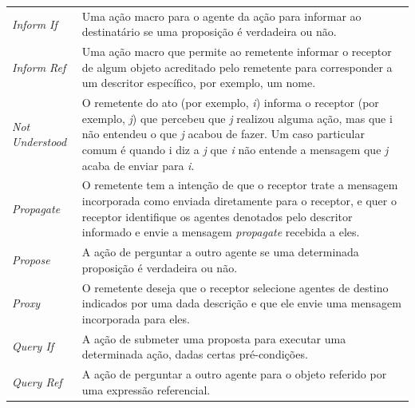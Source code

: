 \begin{table}
{\begin{tabular}{ l l }
  \\  
  \cline{1-1}\cline{2-2}  
    \multicolumn{1}{|p{2.750cm}|}{\textit{Inform If}} &
    \multicolumn{1}{p{11.700cm}|}{Uma ação macro para o agente da ação para informar ao destinatário se uma proposição é verdadeira ou não.}
  \\  
  \cline{1-1}\cline{2-2}  
    \multicolumn{1}{|p{2.750cm}|}{\textit{Inform Ref}} &
    \multicolumn{1}{p{11.700cm}|}{Uma ação macro que permite ao remetente informar o receptor de algum objeto acreditado pelo remetente para corresponder a um descritor específico, por exemplo, um nome.}
  \\  
  \cline{1-1}\cline{2-2}  
    \multicolumn{1}{|p{2.750cm}|}{\textit{Not Understood}} &
    \multicolumn{1}{p{11.700cm}|}{O remetente do ato (por exemplo, \textit{i}) informa o receptor (por exemplo, \textit{j}) que percebeu que \textit{j }realizou alguma ação, mas que i não entendeu o que \textit{j} acabou de fazer. Um caso particular comum é quando i diz a\textit{ j} que \textit{i} não entende a mensagem que \textit{j} acaba de enviar para \textit{i}.}
  \\  
  \cline{1-1}\cline{2-2}  
    \multicolumn{1}{|p{2.750cm}|}{\textit{Propagate}} &
    \multicolumn{1}{p{11.700cm}|}{O remetente tem a intenção de que o receptor trate a mensagem incorporada como enviada diretamente para o receptor, e quer o receptor identifique os agentes denotados pelo descritor informado e envie a mensagem \textit{propagate} recebida a eles.}
  \\  
  \cline{1-1}\cline{2-2}  
    \multicolumn{1}{|p{2.750cm}|}{\textit{Propose}} &
    \multicolumn{1}{p{11.700cm}|}{A ação de perguntar a outro agente se uma determinada proposição é verdadeira ou não.}
  \\  
  \cline{1-1}\cline{2-2}  
    \multicolumn{1}{|p{2.750cm}|}{\textit{Proxy}} &
    \multicolumn{1}{p{11.700cm}|}{O remetente deseja que o receptor selecione agentes de destino indicados por uma dada descrição e que ele envie uma mensagem incorporada para eles.}
  \\  
  \cline{1-1}\cline{2-2}  
    \multicolumn{1}{|p{2.750cm}|}{\textit{Query If}} &
    \multicolumn{1}{p{11.700cm}|}{A ação de submeter uma proposta para executar uma determinada ação, dadas certas pré-condições.}
  \\  
  \cline{1-1}\cline{2-2}  
    \multicolumn{1}{|p{2.750cm}|}{\textit{Query Ref}} &
    \multicolumn{1}{p{11.700cm}|}{A ação de perguntar a outro agente para o objeto referido por uma expressão referencial.}
  \\  

\end{tabular}}
\end{table}
